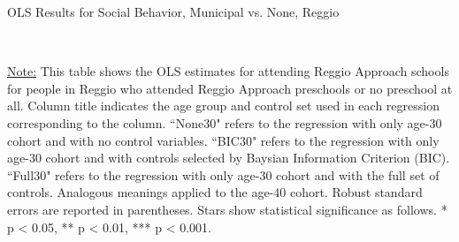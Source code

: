 \begin{table}[H] \caption{OLS Results for Social Behavior, Municipal vs. None, Reggio} \label{ols-S-reg}

\vspace{1ex} \\
\footnotesize\raggedright{\underline{Note:} This table shows the OLS estimates for attending Reggio Approach schools for people in Reggio who attended Reggio Approach preschools or no preschool at all. Column title indicates the age group and control set used in each regression corresponding to the column. ``None30" refers to the regression with only age-30 cohort and with no control variables. ``BIC30" refers to the regression with only age-30 cohort and with controls selected by Baysian Information Criterion (BIC). ``Full30" refers to the regression with only age-30 cohort and with the full set of controls. Analogous meanings applied to the age-40 cohort. Robust standard errors are reported in parentheses. Stars show statistical significance as follows. * p < 0.05, ** p < 0.01, *** p < 0.001.}
\end{table}



